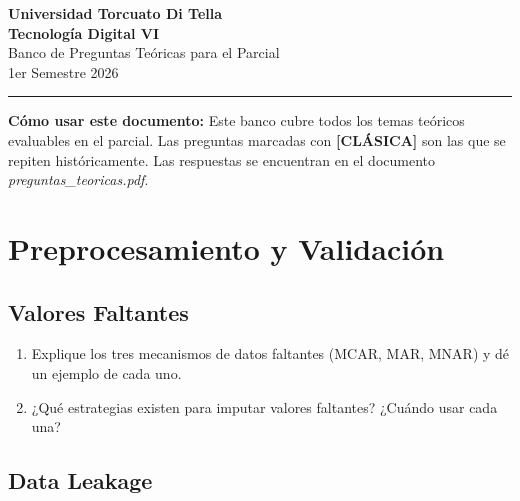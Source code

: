 \documentclass[11pt,a4paper]{article}
\begin{document}
\begin{center}
  {\Large\bfseries\color{tdblue} Universidad Torcuato Di Tella}\\[6pt]
  {\large\bfseries Tecnolog\'ia Digital VI}\\[4pt]
  {\large Banco de Preguntas Te\'oricas para el Parcial}\\[4pt]
  {\normalsize 1er Semestre 2026}\\[12pt]
  \rule{\linewidth}{1.5pt}
\end{center}

\begin{mdframed}[linecolor=tdorange, linewidth=1.5pt, roundcorner=4pt,
  backgroundcolor=lightyellow]
\textbf{C\'omo usar este documento:} Este banco cubre todos los temas te\'oricos
evaluables en el parcial. Las preguntas marcadas con
\textcolor{tdred}{\textbf{[CL\'ASICA]}} son las que se repiten hist\'oricamente.
Las respuestas se encuentran en el documento \textit{preguntas\_teoricas.pdf}.
\end{mdframed}

\vspace{0.5cm}
\tableofcontents
\newpage

\section{Preprocesamiento y Validaci\'on}

\subsection{Valores Faltantes}

\begin{enumerate}[label=\textbf{P\arabic*.}]

\item Explique los tres mecanismos de datos faltantes (MCAR, MAR, MNAR) y d\'e un ejemplo
  de cada uno.

\item ¿Qu\'e estrategias existen para imputar valores faltantes? ¿Cu\'ando usar cada una?

\end{enumerate}

\subsection{Data Leakage}
\end{document}
